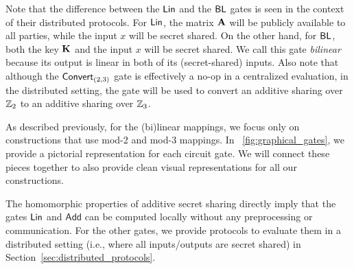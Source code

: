 \noindent Note that the difference between the $\textnormal{\textsf{Lin}}$ and the $\textnormal{\textsf{BL}}$ gates is seen in the context of their distributed protocols. For $\textnormal{\textsf{Lin}}$, the matrix $\mat{A}$ will be publicly available to all parties, while the input $x$ will be secret shared. On the other hand, for $\textnormal{\textsf{BL}}$, both the key $\mat{K}$ and the input $x$ will be secret shared. We call this gate \textit{bilinear} because its output is linear in both of its (secret-shared) inputs. Also note that although the $\textnormal{\textsf{Convert}}_{(2,3)}$ gate is effectively a no-op in a centralized evaluation, in the distributed setting, the gate will be used to convert an additive sharing over $\mathbb{Z}_2$ to an additive sharing over $\mathbb{Z}_3$.

As described previously, for the (bi)linear mappings, we focus only on constructions that use mod-2 and mod-3 mappings. In \fig~\ref{fig:graphical_gates}, we provide a pictorial representation for each circuit gate. We will connect these pieces together to also provide clean visual representations for all our constructions. 

The homomorphic properties of additive secret sharing directly imply that the gates $\textnormal{\textsf{Lin}}$ and $\textsf{Add}$ can be computed locally without any preprocessing or communication. For the other gates, we provide protocols to evaluate them in a distributed setting (i.e., where all inputs/outputs are secret shared) in Section~\ref{sec:distributed_protocols}.




